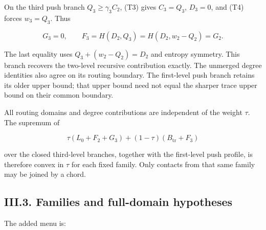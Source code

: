 On the third push branch \(Q_3\ge\gamma_3 C_2\), (T3) gives \(C_3=Q_3\), \(D_3=0\), and (T4) forces \(w_3=Q_3\). Thus

\[
G_3=0,\qquad
F_3=H(D_2,Q_3)=H(D_2,w_2-Q_2)=G_2.
\tag{T7}
\]

The last equality uses \(Q_3+(w_2-Q_2)=D_2\) and entropy symmetry. This branch recovers the two-level recursive contribution exactly. The unmerged degree identities also agree on its routing boundary. The first-level push branch retains its older upper bound; that upper bound need not equal the sharper trace upper bound on their common boundary.

All routing domains and degree contributions are independent of the weight \(\tau\). The supremum of

\[
\tau(L_0+F_2+G_3)+(1-\tau)(B_{\mathrm{tr}}+F_3)
\tag{T8}
\]

over the closed third-level branches, together with the first-level push profile, is therefore convex in \(\tau\) for each fixed family. Only contacts from that same family may be joined by a chord.

\hypertarget{af-a9ec399514-iii.3.-families-and-full-domain-hypotheses}{%
\subsection{III.3. Families and full-domain hypotheses}\label{af-a9ec399514-iii.3.-families-and-full-domain-hypotheses}}

The added menu is:

